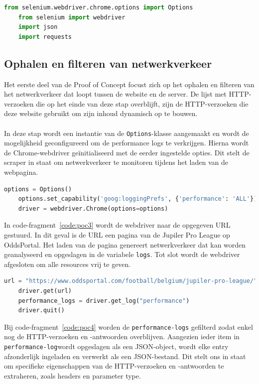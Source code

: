 \begin{lstlisting}[language=python, captionpos=b, caption={De imports voor Proof of Concept.}, label={code:poc1}]
    from selenium.webdriver.chrome.options import Options
    from selenium import webdriver
    import json
    import requests
\end{lstlisting}

\subsection{Ophalen en filteren van netwerkverkeer}
Het eerste deel van de Proof of Concept focust zich op het ophalen en filteren van het netwerkverkeer dat loopt tussen de website en de server. De lijst met HTTP-verzoeken die op het einde van deze stap overblijft, zijn de HTTP-verzoeken die deze website gebruikt om zijn inhoud dynamisch op te bouwen.
\\ \\
In deze stap wordt een instantie van de \texttt{Options}-klasse aangemaakt en wordt de mogelijkheid geconfigureerd om de performance logs te verkrijgen. Hierna wordt de Chrome-webdriver geïnitialiseerd  met de eerder ingestelde opties. Dit stelt de scraper in staat om netwerkverkeer te monitoren tijdens het laden van de webpagina.
\begin{lstlisting}[language=python, captionpos=b, caption={De imports voor Proof of Concept.}, label={code:poc2}]
    options = Options()
    options.set_capability('goog:loggingPrefs', {'performance': 'ALL'})
    driver = webdriver.Chrome(options=options)
\end{lstlisting}

In code-fragment~\ref{code:poc3} wordt de webdriver naar de opgegeven URL gestuurd. In dit geval is de URL een pagina van de Jupiler Pro League op OddsPortal. Het laden van de pagina genereert netwerkverkeer dat kan worden geanalyseerd en opgeslagen in de variabele \texttt{logs}. Tot slot wordt de webdriver afgesloten om alle resources vrij te geven.

\begin{lstlisting}[language=python, captionpos=b, caption={Ophalen van het netwerkverkeer}, label={code:poc3}]
    url = "https://www.oddsportal.com/football/belgium/jupiler-pro-league/"
    driver.get(url)
    performance_logs = driver.get_log("performance")
    driver.quit()
\end{lstlisting}

Bij code-fragment~\ref{code:poc4} worden de \texttt{performance-logs} gefilterd zodat enkel nog de HTTP-verzoeken en -antwoorden overblijven. Aangezien ieder item in \texttt{performance-log}wordt opgeslagen als een JSON-object, wordt elke entry afzonderlijk ingeladen en verwerkt als een JSON-bestand. Dit stelt ons in staat om specifieke eigenschappen van de HTTP-verzoeken en -antwoorden te extraheren, zoals headers en parameter type.


